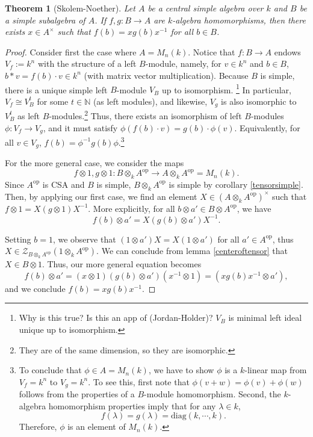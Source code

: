 \documentclass{tufte-handout} %
\newtheorem{thm}{Theorem}
\theoremstyle{definition}
\theoremstyle{remark}
\newcommand{\bra}[1]{\left(#1\right)}
\newcommand{\op}[1]{#1^{\text{op}}}
\newcommand{\N}{\mathbb{N}}
\newcommand{\mZ}{\mathcal{Z}}
\begin{document}
\begin{thm}[Skolem-Noether]
	Let $A$ be a central simple algebra over $k$ and $B$ be a simple subalgebra of $A$. If $f,g: B \rightarrow A$ are $k$-algebra homomorphisms, then there exists $x \in A^{\times}$ such that $f(b) = xg(b)x^{-1}$ for all $b \in B$.
\end{thm}
\begin{proof}
	Consider first the case where $A = M_n(k)$. Notice that $f:B\rightarrow A$ endows $V_f := k^n$ with the structure of a left $B$-module, namely, for $v \in k^n$ and $b \in B$, $b \ast v = f(b) \cdot v \in k^n$ (with matrix vector multiplication). Because $B$ is simple, there is a unique simple left $B$-module $V_B$ up to isomorphism. \footnote{Why is this true? Is this an app of (Jordan-Holder)? $V_B$ is minimal left ideal unique up to isomorphism.} In particular, $V_f \cong V_B^t$ for some $t \in \N$ (as left modules), and likewise, $V_g$ is also isomorphic to $V_B^t$ as left $B$-modules.\footnote{They are of the same dimension, so they are isomorphic.} Thus, there exists an isomorphism of left $B$-modules $\phi: V_f \rightarrow V_g$, and it must satisfy $\phi(f(b)\cdot v) = g(b) \cdot \phi(v)$. Equivalently, for all $v \in V_g$, $f(b) = \phi^{-1}g(b)\phi$.\footnote{To conclude that $\phi \in A = M_n(k)$, we have to show $\phi$ is a $k$-linear map from $V_f = k^n$ to $V_g = k^n$. To see this, first note that $\phi(v+w) = \phi(v)+\phi(w)$ follows from the properties of a $B$-module homomorphism. Second, the $k$-algebra homomorphism properties imply that for any $\lambda \in k$,  \[f(\lambda) = g(\lambda)= \text{diag}(k,\cdots, k).\]
	Therefore, $\phi$ is an element of $M_n(k)$.}
	
	For the more general case, we consider the maps
	\[f\otimes 1, g\otimes 1: B\otimes_k \op{A} \rightarrow A \otimes_k \op{A} = M_n(k).\]
	Since $\op{A}$ is CSA and $B$ is simple, $B\otimes_k \op{A}$ is simple by corollary \ref{tensorsimple}. Then, by applying our first case, we find an element $X \in \bra{A\otimes_k \op{A}}^{\times}$ such that $f \otimes 1 = X(g \otimes 1)X^{-1}$. More explicitly, for all $b \otimes a' \in B \otimes \op{A}$, we have 
	\[f(b) \otimes a' = X(g(b) \otimes a') X^{-1}.\]
	
	Setting $b = 1$, we observe that $(1\otimes a')X = X(1 \otimes a')$ for all $a' \in \op{A}$, thus $X \in \mZ_{B \otimes_k \op{A}}(1 \otimes_k \op{A})$. We can conclude from lemma \ref{centeroftensor} that $X \in B \otimes 1$. Thus, our more general equation becomes 
	\[f(b) \otimes a' = (x\otimes 1)(g(b) \otimes a')(x^{-1} \otimes 1) = (xg(b)x^{-1} \otimes a'),\]
	and we conclude $f(b) = xg(b)x^{-1}$.
\end{proof}
\end{document}
